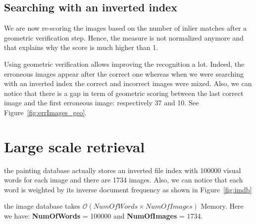 \documentclass{article}
\begin{document}

\subsection{Searching with an inverted index}

We are now re-scoring the images based on the number of inlier matches after a geometric verification step. Hence, the measure is not normalized anymore and that explains why the score is much higher than 1.


Using geometric verification allows improving the recognition a lot. Indeed, the erroneous images appear after the correct one whereas when we were searching with an inverted index the correct and incorrect images were mixed. Also, we can notice that there is a gap in term of geometric scoring between the last correct image and the first erroneous image: respectively 37 and 10. See Figure~\ref{fig:errImages_geo}.


\section{Large scale retrieval}

the painting database actually stores an inverted file index with 100000 visual words for each image and there are 1734 images. Also, we can notice that each word is weighted by its inverse document frequency as shown in Figure~\ref{fig:imdb}



the image database takes $\mathcal{O}(NumOfWords \times NumOfImages)$ Memory. \newline
Here we have: \textbf{NumOfWords} = 100000 and \textbf{NumOfImages} = 1734.

\end{document}
